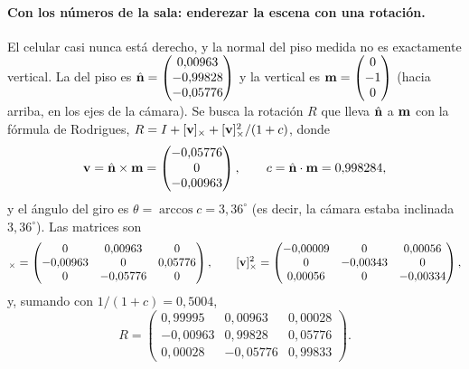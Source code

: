 \paragraph{Con los números de la sala: enderezar la escena con una rotación.} El celular casi nunca está derecho, y la normal del piso medida no es exactamente vertical. La del piso es
$\hat{\mathbf{n}}=\begin{pmatrix} 0{,}00963 \\ -0{,}99828 \\ -0{,}05776 \end{pmatrix}$ y la vertical es $\mathbf{m}=\begin{pmatrix} 0 \\ -1 \\ 0 \end{pmatrix}$ (hacia arriba, en los ejes de la cámara). Se busca la rotación $R$ que lleva $\hat{\mathbf{n}}$ a $\mathbf{m}$ con la
fórmula de Rodrigues, $R=I+[\mathbf{v}]_\times+[\mathbf{v}]_\times^{2}/(1+c)$, donde
\begin{equation}
\mathbf{v}=\hat{\mathbf{n}}\times\mathbf{m}=\begin{pmatrix} -0{,}05776 \\ 0 \\ -0{,}00963 \end{pmatrix},\qquad c=\hat{\mathbf{n}}\cdot\mathbf{m}=0{,}998284,
\end{equation}
y el ángulo del giro es $\theta=\arccos c=3{,}36^\circ$ (es decir, la cámara estaba inclinada $3{,}36^\circ$). Las matrices son
\begin{equation}
[\vect{v}]_\times=\begin{pmatrix} 0 & 0{,}00963 & 0 \\ -0{,}00963 & 0 & 0{,}05776 \\ 0 & -0{,}05776 & 0 \end{pmatrix},\qquad [\vect{v}]_\times^{2}=\begin{pmatrix} -0{,}00009 & 0 & 0{,}00056 \\ 0 & -0{,}00343 & 0 \\ 0{,}00056 & 0 & -0{,}00334 \end{pmatrix} ,
\end{equation}
y, sumando con $1/(1+c)=0{,}5004$,
\begin{equation}
R=\begin{pmatrix} 0{,}99995 & 0{,}00963 & 0{,}00028 \\ -0{,}00963 & 0{,}99828 & 0{,}05776 \\ 0{,}00028 & -0{,}05776 & 0{,}99833 \end{pmatrix} .
\end{equation}
